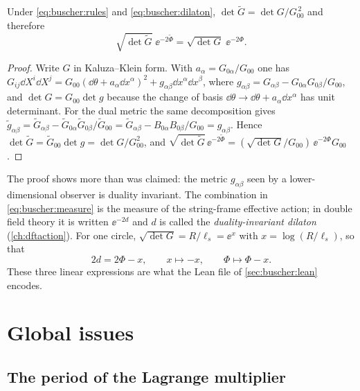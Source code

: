 \begin{proposition}\label{prop:buscher:measure}
Under \eqref{eq:buscher:rules} and \eqref{eq:buscher:dilaton},
$\det\tilde G=\det G/G_{00}^{\,2}$ and therefore
\begin{equation}\label{eq:buscher:measure}
 \sqrt{\det\tilde G}\;\ee^{-2\tilde\Phi}=\sqrt{\det G}\;\ee^{-2\Phi}.
\end{equation}
\end{proposition}
\begin{proof}
Write $G$ in Kaluza--Klein form. With $a_\alpha=G_{0\alpha}/G_{00}$ one has
$G_{ij}\dd X^i\dd X^j=G_{00}(\dd\theta+a_\alpha\dd x^\alpha)^2
+g_{\alpha\beta}\dd x^\alpha\dd x^\beta$, where
$g_{\alpha\beta}=G_{\alpha\beta}-G_{0\alpha}G_{0\beta}/G_{00}$, and
$\det G=G_{00}\det g$ because the change of basis
$\dd\theta\to\dd\theta+a_\alpha\dd x^\alpha$ has unit determinant. For the dual metric
the same decomposition gives $\tilde g_{\alpha\beta}=\tilde G_{\alpha\beta}
-\tilde G_{0\alpha}\tilde G_{0\beta}/\tilde G_{00}
=\tilde G_{\alpha\beta}-B_{0\alpha}B_{0\beta}/G_{00}=g_{\alpha\beta}$. Hence
$\det\tilde G=\tilde G_{00}\det g=\det G/G_{00}^2$, and
$\sqrt{\det\tilde G}\,\ee^{-2\tilde\Phi}=(\sqrt{\det G}/G_{00})\,\ee^{-2\Phi}G_{00}$.
\end{proof}
The proof shows more than was claimed: the metric $g_{\alpha\beta}$ seen by a
lower-dimensional observer is duality invariant. The combination in
\eqref{eq:buscher:measure} is the measure of the string-frame effective action; in double
field theory it is written $\ee^{-2d}$ and $d$ is called the \emph{duality-invariant
dilaton} (\cref{ch:dftaction}). For one circle,
$\sqrt{\det G}=R/\ell_s=\ee^{x}$ with $x=\log(R/\ell_s)$, so that
\begin{equation}\label{eq:buscher:twod}
 2d=2\Phi-x,\qquad x\mapsto-x,\qquad \Phi\mapsto\Phi-x .
\end{equation}
These three linear expressions are what the Lean file of \cref{sec:buscher:lean} encodes.

\section{Global issues}\label{sec:buscher:global}

\subsection{The period of the Lagrange multiplier}

